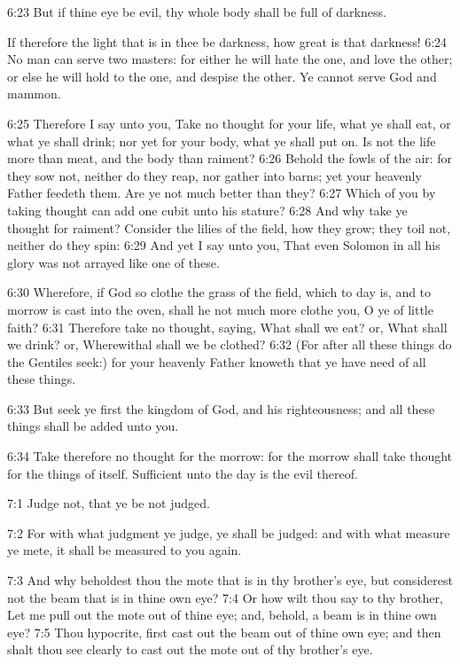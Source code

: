 6:23 But if thine eye be evil, thy whole body shall be full of darkness.

If therefore the light that is in thee be darkness, how great is that darkness!  6:24 No man can serve two masters: for either he will hate the one, and love the other; or else he will hold to the one, and despise the other. Ye cannot serve God and mammon.

6:25 Therefore I say unto you, Take no thought for your life, what ye shall eat, or what ye shall drink; nor yet for your body, what ye shall put on. Is not the life more than meat, and the body than raiment?  6:26 Behold the fowls of the air: for they sow not, neither do they reap, nor gather into barns; yet your heavenly Father feedeth them. Are ye not much better than they?  6:27 Which of you by taking thought can add one cubit unto his stature?  6:28 And why take ye thought for raiment? Consider the lilies of the field, how they grow; they toil not, neither do they spin: 6:29 And yet I say unto you, That even Solomon in all his glory was not arrayed like one of these.

6:30 Wherefore, if God so clothe the grass of the field, which to day is, and to morrow is cast into the oven, shall he not much more clothe you, O ye of little faith?  6:31 Therefore take no thought, saying, What shall we eat? or, What shall we drink? or, Wherewithal shall we be clothed?  6:32 (For after all these things do the Gentiles seek:) for your heavenly Father knoweth that ye have need of all these things.

6:33 But seek ye first the kingdom of God, and his righteousness; and all these things shall be added unto you.

6:34 Take therefore no thought for the morrow: for the morrow shall take thought for the things of itself. Sufficient unto the day is the evil thereof.

7:1 Judge not, that ye be not judged.

7:2 For with what judgment ye judge, ye shall be judged: and with what measure ye mete, it shall be measured to you again.

7:3 And why beholdest thou the mote that is in thy brother's eye, but considerest not the beam that is in thine own eye?  7:4 Or how wilt thou say to thy brother, Let me pull out the mote out of thine eye; and, behold, a beam is in thine own eye?  7:5 Thou hypocrite, first cast out the beam out of thine own eye; and then shalt thou see clearly to cast out the mote out of thy brother's eye.

